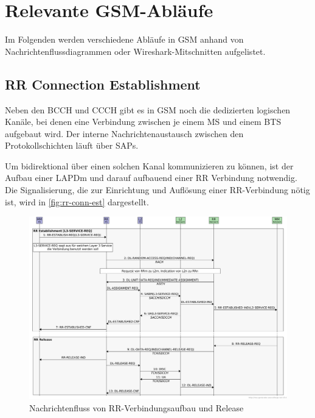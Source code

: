 \chapter{Relevante GSM-Abläufe} \label{hdl:grundlagen_ablufe}

Im Folgenden werden verschiedene Abläufe in \ac{GSM} anhand von Nachrichtenflussdiagrammen oder Wireshark-Mitschnitten aufgelistet.

\section{\acl{RR} Connection Establishment} \label{hdl:grundlagen_rr-conn-est}

Neben den \ac{BCCH} und \ac{CCCH} gibt es in \ac{GSM} noch die dedizierten logischen Kanäle, bei denen eine Verbindung zwischen je einem \ac{MS} und einem \ac{BTS} aufgebaut wird. Der interne Nachrichtenaustausch zwischen den Protokollschichten läuft über \acp{SAP}.

Um bidirektional über einen solchen Kanal kommunizieren zu können, ist der Aufbau einer \ac{LAPDm} und darauf aufbauend einer \ac{RR} Verbindung notwendig. Die Signalisierung, die zur Einrichtung und Auflösung einer \ac{RR}-Verbindung nötig ist, wird in \autoref{fig:rr-conn-est} dargestellt.

\begin{figure}[H]
  \begin{center}
    \includegraphics[width=1.00\textwidth]{figures/gsm_rr-chan-est-rel.pdf}
  \end{center}
  \caption[Nachrichtenfluss von RR-Verbindungsaufbaus und Release]{Nachrichtenfluss von \ac{RR}-Verbindungsaufbau und Release} \label{fig:rr-conn-est}
\end{figure}

